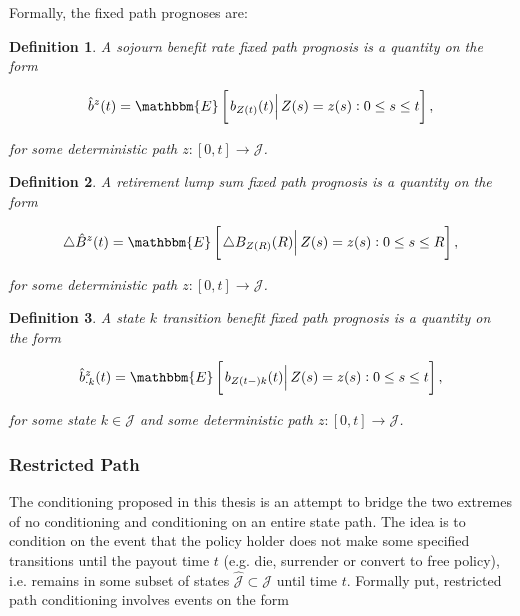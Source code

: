 \documentclass{article}
\newcommand{\1}[1]{\mathbbm{1}_{\left\lbrace #1 \right\rbrace}}
\newcommand{\econd}[2][def]{\mathbbm{E} \left[ \left. #1 \right| #2 \right]}
\theoremstyle{break}
\newtheorem{definition}{Definition}[section]
\theoremstyle{remark}
\numberwithin{equation}{section}
\begin{document}
Formally, the fixed path prognoses are:

\begin{definition} \label{DefSojFix}
	A sojourn benefit rate fixed path prognosis is a quantity on the form
	
	\begin{gather*}
		\hat{b}^z(t) = \econd[b_{Z(t)}(t)]{Z(s) = z(s) : 0 \leq s \leq t},
	\end{gather*}
	
	for some deterministic path $z: [0,t] \to \mathcal{J}$.
\end{definition}

\begin{definition} \label{DefLumpFix}
	A retirement lump sum fixed path prognosis is a quantity on the form
	
	\begin{gather*}
		\triangle \hat{B}^z(t) = \econd[\triangle B_{Z(R)}(R)]{Z(s) = z(s) : 0 \leq s \leq R},
	\end{gather*}
	
	for some deterministic path $z: [0,t] \to \mathcal{J}$.
\end{definition}

\begin{definition} \label{DefTraFix}
	A state $k$ transition benefit fixed path prognosis is a quantity on the form
	
	\begin{gather*}
		\hat{b}_{\cdot k}^z(t) = \econd[b_{Z(t-)k}(t)]{ Z(s) = z(s) : 0 \leq s \leq t},
	\end{gather*}
	
	for some state $k \in \mathcal{J}$ and some deterministic path $z: [0,t] \to \mathcal{J}$.
\end{definition}

\subsubsection{Restricted Path} \label{RestrPathSect}

The conditioning proposed in this thesis is an attempt to bridge the two extremes of no conditioning and conditioning on an entire state path. The idea is to condition on the event that the policy holder does not make some specified transitions until the payout time $t$ (e.g. die, surrender or convert to free policy), i.e. remains in some subset of states $\hat{\mathcal{J}} \subset \mathcal{J}$ until time $t$. Formally put, restricted path conditioning involves events on the form
\end{document}
